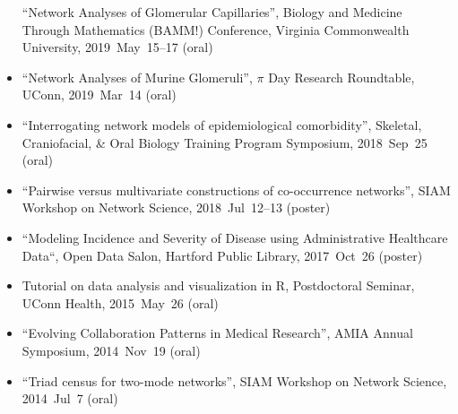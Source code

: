 \documentclass[10pt,a4paper]{article}
\begin{document}
\begin{itemize}[label=$\circ$,nolistsep]
``Network Analyses of Glomerular Capillaries'', Biology and Medicine Through Mathematics (BAMM!) Conference, Virginia Commonwealth University, 2019~May~15--17 (oral)
\item
``Network Analyses of Murine Glomeruli'', $\pi$ Day Research Roundtable, UConn, 2019~Mar~14 (oral)
\item
``Interrogating network models of epidemiological comorbidity'', Skeletal, Craniofacial, \& Oral Biology Training Program Symposium, 2018~Sep~25 (oral)
\item
``Pairwise versus multivariate constructions of co-occurrence networks'', SIAM Workshop on Network Science, 2018~Jul~12--13 (poster)
\item
``Modeling Incidence and Severity of Disease using Administrative Healthcare Data``, Open Data Salon, Hartford Public Library, 2017~Oct~26 (poster)
\item
Tutorial on data analysis and visualization in R, Postdoctoral Seminar, UConn Health, 2015~May~26 (oral)
\item
``Evolving Collaboration Patterns in Medical Research'', AMIA Annual Symposium, 2014~Nov~19 (oral)
\item
``Triad census for two-mode networks'', SIAM Workshop on Network Science, 2014~Jul~7 (oral)

\end{itemize}
\end{document}
